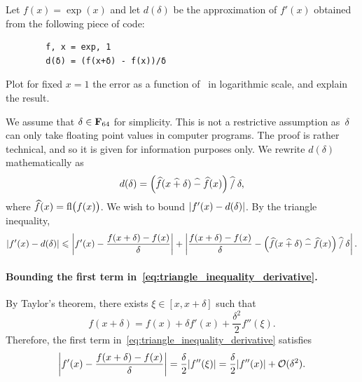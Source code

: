\begin{compexercise}
    \label{exercise_differentiation}
    Let $f(x) = \exp(x)$ and let $d(\delta)$ be the approximation of $f'(x)$ obtained from the following piece of code:
    \begin{verbatim}
        f, x = exp, 1
        d(δ) = (f(x+δ) - f(x))/δ
    \end{verbatim}
    Plot for fixed $x = 1$ the error  as a function of~ in logarithmic scale,
    and explain the result.
\end{compexercise}
\begin{solution}
    We assume that $\delta \in \mathbf F_{64}$ for simplicity.
    This is not a restrictive assumption
    as~$\delta$ can only take floating point values in computer programs.
    The proof is rather technical, and so it is given for information purposes only.
    We rewrite $d(\delta)$ mathematically as
    \[
        d(\delta) = \Bigl(\widehat f(x \mathbin{\widehat +} \delta) \mathbin{\widehat -} \widehat f(x)\Bigr) \mathbin{\widehat /} \delta,
    \]
    where $\widehat f(x) = {\rm fl} \bigl(f(x)\bigr)$.
    We wish to bound $\lvert f'(x) - d(\delta)\rvert$.
    By the triangle inequality,
    \begin{equation}
        \label{eq:triangle_inequality_derivative}
        \lvert f'(x) - d(\delta)\rvert
        \leqslant \left\lvert f'(x) - \frac{f(x + \delta) - f(x)}{\delta} \right\rvert
        + \left\lvert \frac{f(x + \delta) - f(x)}{\delta} - \Bigl(\widehat f(x \mathbin{\widehat +} \delta) \mathbin{\widehat -} \widehat f(x)\Bigr) \mathbin{\widehat /} \delta \right\rvert.
    \end{equation}
    \paragraph{Bounding the first term in~\eqref{eq:triangle_inequality_derivative}.}
    By Taylor's theorem, there exists $\xi \in [x, x+\delta]$ such that
    \[
        f(x + \delta) = f(x) + \delta f'(x) + \frac{\delta^2}{2} f''(\xi).
    \]
    Therefore, the first term in~\eqref{eq:triangle_inequality_derivative} satisfies
    \[
        \left\lvert f'(x) - \frac{f(x + \delta) - f(x)}{\delta} \right\rvert
        = \frac{\delta}{2} \lvert f''(\xi) \rvert
        = \frac{\delta}{2} \lvert f''(x) \rvert + \mathcal O(\delta^2).
    \]


\end{solution}
